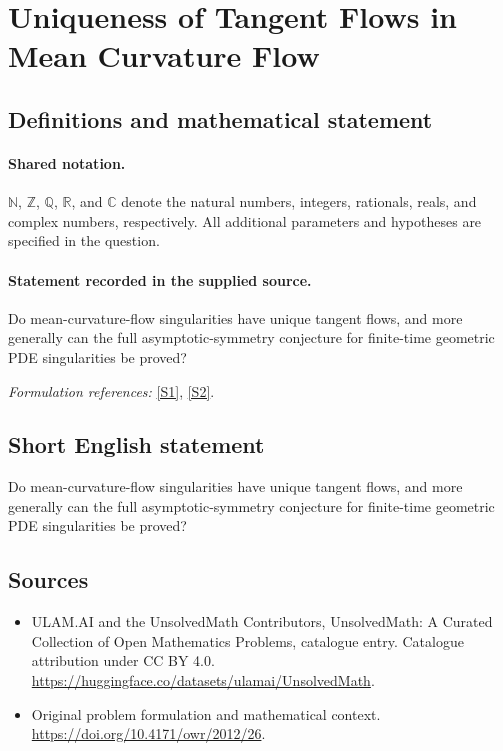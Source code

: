 \documentclass[11pt]{article}
\newcommand{\sref}[2]{\hyperlink{source:#1:#2}{[S#2]}}
\begin{document}
\section{Uniqueness of Tangent Flows in Mean Curvature Flow}\label{statement}

\subsection{Definitions and mathematical statement}

\paragraph{Shared notation.}$\mathbb N$, $\mathbb Z$, $\mathbb Q$, $\mathbb R$, and $\mathbb C$ denote the natural numbers, integers, rationals, reals, and complex numbers, respectively. All additional parameters and hypotheses are specified in the question.


\paragraph{Statement recorded in the supplied source.}
Do mean-curvature-flow singularities have unique tangent flows, and more generally can the full asymptotic-symmetry conjecture for finite-time geometric PDE singularities be proved?
\par\smallskip\textit{Formulation references:} \sref{statement}{1}, \sref{statement}{2}.
\subsection{Short English statement}
Do mean-curvature-flow singularities have unique tangent flows, and more generally can the full asymptotic-symmetry conjecture for finite-time geometric PDE singularities be proved?
\subsection{Sources}
\begin{itemize}
\item[\hypertarget{source:statement:1}{S1}] ULAM.AI and the UnsolvedMath Contributors, UnsolvedMath: A Curated Collection of Open Mathematics Problems, catalogue entry. Catalogue attribution under CC BY 4.0.
\url{https://huggingface.co/datasets/ulamai/UnsolvedMath}.
\item[\hypertarget{source:statement:2}{S2}] Original problem formulation and mathematical context.
\url{https://doi.org/10.4171/owr/2012/26}.
\end{itemize}
\label{end:statement}
\end{document}
